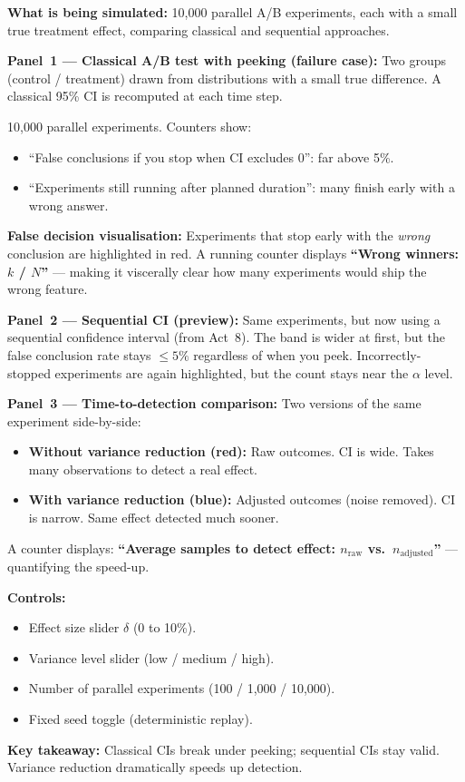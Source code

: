 \documentclass[12pt, a4paper]{article}
\begin{document}
\begin{simulation}
\textbf{What is being simulated:}
10,000 parallel A/B experiments, each with a small true treatment effect,
comparing classical and sequential approaches.

\textbf{Panel~1 --- Classical A/B test with peeking (failure case):}
Two groups (control / treatment) drawn from distributions with a small true
difference.  A classical 95\% CI is recomputed at each time step.

10,000 parallel experiments.  Counters show:
\begin{itemize}[nosep]
  \item ``False conclusions if you stop when CI excludes 0'': far above 5\%.
  \item ``Experiments still running after planned duration'': many finish
        early with a wrong answer.
\end{itemize}

\textbf{False decision visualisation:}
Experiments that stop early with the \emph{wrong} conclusion are highlighted
in red.  A running counter displays \textbf{``Wrong winners: $k$ / $N$''}
--- making it viscerally clear how many experiments would ship the wrong
feature.

\textbf{Panel~2 --- Sequential CI (preview):}
Same experiments, but now using a sequential confidence interval (from Act~8).
The band is wider at first, but the false conclusion rate stays $\leq 5\%$
regardless of when you peek.  Incorrectly-stopped experiments are again
highlighted, but the count stays near the $\alpha$ level.

\textbf{Panel~3 --- Time-to-detection comparison:}
Two versions of the same experiment side-by-side:
\begin{itemize}[nosep]
  \item \textbf{Without variance reduction (red):} Raw outcomes.  CI is wide.
        Takes many observations to detect a real effect.
  \item \textbf{With variance reduction (blue):} Adjusted outcomes (noise
        removed).  CI is narrow.  Same effect detected much sooner.
\end{itemize}
A counter displays: \textbf{``Average samples to detect effect: $n_{\text{raw}}$
vs.\ $n_{\text{adjusted}}$''} --- quantifying the speed-up.

\textbf{Controls:}
\begin{itemize}[nosep]
  \item Effect size slider $\delta$ (0 to 10\%).
  \item Variance level slider (low / medium / high).
  \item Number of parallel experiments (100 / 1,000 / 10,000).
  \item Fixed seed toggle (deterministic replay).
\end{itemize}

\textbf{Key takeaway:}
Classical CIs break under peeking; sequential CIs stay valid.  Variance
reduction dramatically speeds up detection.
\end{simulation}
\end{document}
